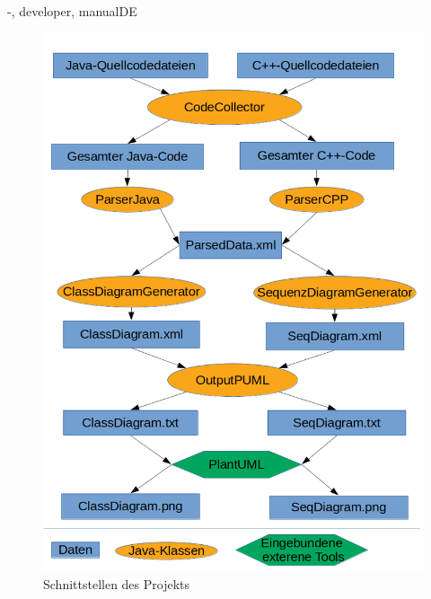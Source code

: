\documentclass[twoside]{report}
\begin{document}
\begin{shownto}{-, developer, manualDE}
\begin{figure}[H]
\centering
\includegraphics[scale=0.6]{Bilder/Schnittstellen.png}
\caption{Schnittstellen des Projekts}
\end{figure}
\nsecend



\end{shownto}
\end{document}
